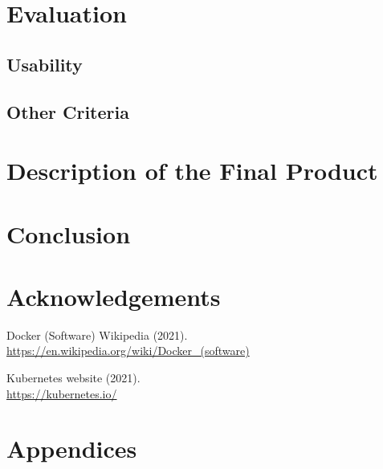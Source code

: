 \documentclass[twocolumn]{article}
\begin{document}
\section{Evaluation}
\vspace{-1ex}

\subsection{Usability}

\subsection{Other Criteria}

\section{Description of the Final Product}
\vspace{-1ex}

\section{Conclusion}
\vspace{-1ex}

\section*{Acknowledgements}
\vspace{-1ex}

\begin{thebibliography}{9}

  Docker (Software) Wikipedia (2021).\\
  \url{https://en.wikipedia.org/wiki/Docker_(software)}

  Kubernetes website (2021).\\
  \url{https://kubernetes.io/}
\end{thebibliography}

\section*{Appendices}
\vspace{-1ex}
\end{document}
